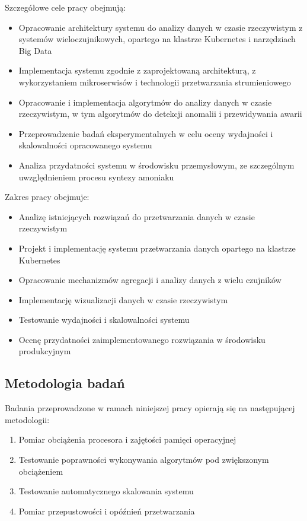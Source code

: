Szczegółowe cele pracy obejmują:
\begin{itemize}
    \item Opracowanie architektury systemu do analizy danych w czasie rzeczywistym z systemów wieloczujnikowych, opartego na klastrze Kubernetes i narzędziach Big Data
    \item Implementacja systemu zgodnie z zaprojektowaną architekturą, z wykorzystaniem mikroserwisów i technologii przetwarzania strumieniowego
    \item Opracowanie i implementacja algorytmów do analizy danych w czasie rzeczywistym, w tym algorytmów do detekcji anomalii i przewidywania awarii
    \item Przeprowadzenie badań eksperymentalnych w celu oceny wydajności i skalowalności opracowanego systemu
    \item Analiza przydatności systemu w środowisku przemysłowym, ze szczególnym uwzględnieniem procesu syntezy amoniaku
\end{itemize}

Zakres pracy obejmuje:
\begin{itemize}
    \item Analizę istniejących rozwiązań do przetwarzania danych w czasie rzeczywistym
    \item Projekt i implementację systemu przetwarzania danych opartego na klastrze Kubernetes
    \item Opracowanie mechanizmów agregacji i analizy danych z wielu czujników
    \item Implementację wizualizacji danych w czasie rzeczywistym
    \item Testowanie wydajności i skalowalności systemu
    \item Ocenę przydatności zaimplementowanego rozwiązania w środowisku produkcyjnym
\end{itemize}

\subsection{Metodologia badań}
\label{subsec:metodologia}

Badania przeprowadzone w ramach niniejszej pracy opierają się na następującej metodologii:

\begin{enumerate}
    \item Pomiar obciążenia procesora i zajętości pamięci operacyjnej
    \item Testowanie poprawności wykonywania algorytmów pod zwiększonym obciążeniem
    \item Testowanie automatycznego skalowania systemu
    \item Pomiar przepustowości i opóźnień przetwarzania
\end{enumerate}

